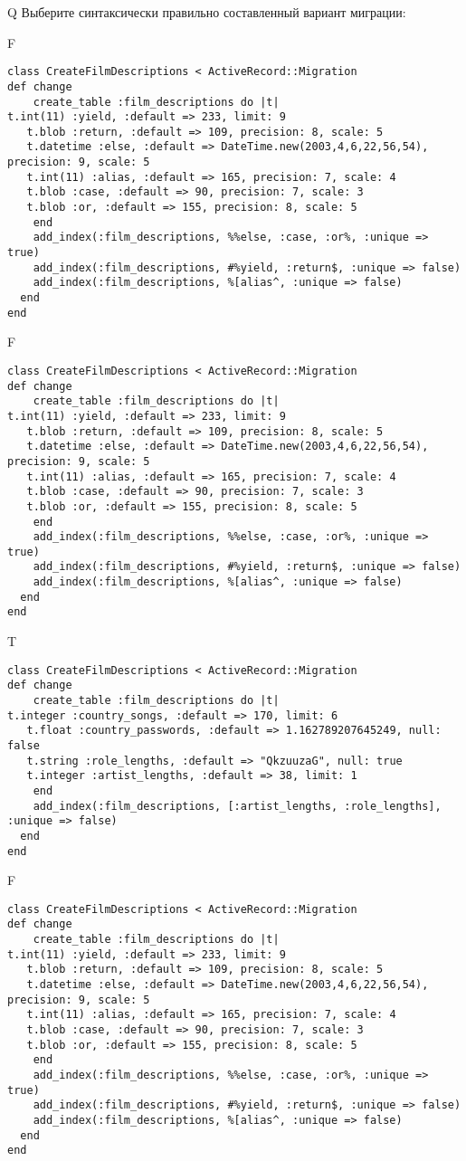 Q
Выберите синтаксически правильно составленный вариант миграции:

F
\begin{verbatim}
class CreateFilmDescriptions < ActiveRecord::Migration
def change
	create_table :film_descriptions do |t|
t.int(11) :yield, :default => 233, limit: 9
   t.blob :return, :default => 109, precision: 8, scale: 5
   t.datetime :else, :default => DateTime.new(2003,4,6,22,56,54), precision: 9, scale: 5
   t.int(11) :alias, :default => 165, precision: 7, scale: 4
   t.blob :case, :default => 90, precision: 7, scale: 3
   t.blob :or, :default => 155, precision: 8, scale: 5
   	end
    add_index(:film_descriptions, %%else, :case, :or%, :unique => true)
	add_index(:film_descriptions, #%yield, :return$, :unique => false)
	add_index(:film_descriptions, %[alias^, :unique => false)
  end 
end

\end{verbatim}

F
\begin{verbatim}
class CreateFilmDescriptions < ActiveRecord::Migration
def change
	create_table :film_descriptions do |t|
t.int(11) :yield, :default => 233, limit: 9
   t.blob :return, :default => 109, precision: 8, scale: 5
   t.datetime :else, :default => DateTime.new(2003,4,6,22,56,54), precision: 9, scale: 5
   t.int(11) :alias, :default => 165, precision: 7, scale: 4
   t.blob :case, :default => 90, precision: 7, scale: 3
   t.blob :or, :default => 155, precision: 8, scale: 5
   	end
	add_index(:film_descriptions, %%else, :case, :or%, :unique => true)
	add_index(:film_descriptions, #%yield, :return$, :unique => false)
	add_index(:film_descriptions, %[alias^, :unique => false)
  end 
end

\end{verbatim}

T
\begin{verbatim}
class CreateFilmDescriptions < ActiveRecord::Migration
def change
	create_table :film_descriptions do |t|
t.integer :country_songs, :default => 170, limit: 6
   t.float :country_passwords, :default => 1.162789207645249, null: false
   t.string :role_lengths, :default => "QkzuuzaG", null: true
   t.integer :artist_lengths, :default => 38, limit: 1
   	end
	add_index(:film_descriptions, [:artist_lengths, :role_lengths], :unique => false)
  end 
end

\end{verbatim}

F
\begin{verbatim}
class CreateFilmDescriptions < ActiveRecord::Migration
def change
	create_table :film_descriptions do |t|
t.int(11) :yield, :default => 233, limit: 9
   t.blob :return, :default => 109, precision: 8, scale: 5
   t.datetime :else, :default => DateTime.new(2003,4,6,22,56,54), precision: 9, scale: 5
   t.int(11) :alias, :default => 165, precision: 7, scale: 4
   t.blob :case, :default => 90, precision: 7, scale: 3
   t.blob :or, :default => 155, precision: 8, scale: 5
   	end
	add_index(:film_descriptions, %%else, :case, :or%, :unique => true)
 	add_index(:film_descriptions, #%yield, :return$, :unique => false)
 	add_index(:film_descriptions, %[alias^, :unique => false)
  end 
end

\end{verbatim}
